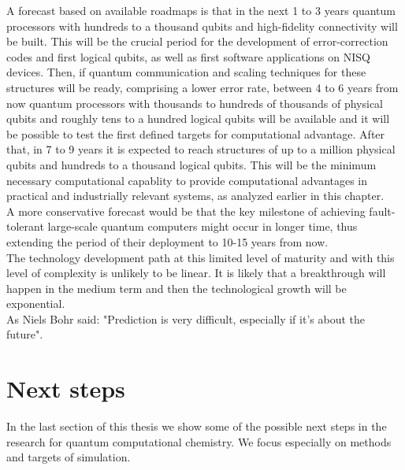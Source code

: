 A forecast based on available roadmaps is that in the next 1 to 3 years quantum processors with hundreds to a thousand qubits and high-fidelity connectivity will be built. This will be the crucial period for the development of error-correction codes and first logical qubits, as well as first software applications on NISQ devices. Then, if quantum communication and scaling techniques for these structures will be ready, comprising a lower error rate, between 4 to 6 years from now quantum processors with thousands to hundreds of thousands of physical qubits and roughly tens to a hundred logical qubits will be available and it will be possible to test the first defined targets for computational advantage. After that, in 7 to 9 years it is expected to reach structures of up to a million physical qubits and hundreds to a thousand logical qubits. This will be the minimum necessary computational capablity to provide computational advantages in practical and industrially relevant systems, as analyzed earlier in this chapter. \\
A more conservative forecast would be that the key milestone of achieving fault-tolerant large-scale quantum computers might occur in longer time, thus extending the period of their deployment to 10-15 years from now. \\
The technology development path at this limited level of maturity and with this level of complexity is unlikely to be linear. It is likely that a breakthrough will happen in the medium term and then the technological growth will be exponential. \\
As Niels Bohr said: "Prediction is very difficult, especially if it's about the future".

\section{Next steps}
In the last section of this thesis we show some of the possible next steps in the research for quantum computational chemistry. We focus especially on methods and targets of simulation.

